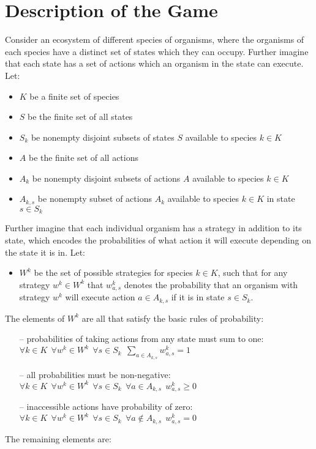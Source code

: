 \section{Description of the Game}\label{section:formalism}

Consider an ecosystem of different species of organisms, where the organisms of each species have a distinct set of states which they can occupy. Further imagine that each state has a set of actions which an organism in the state can execute.
Let:
\begin{itemize}[leftmargin=*,labelsep=4mm]
\item   $K$ be a finite set of species
\item	$S$ be the finite set of all states
\item   $S_k$ be nonempty disjoint subsets of states $S$ available to species $k\in K$
\item   $A$ be the finite set of all actions
\item   $A_k$ be nonempty disjoint subsets of actions $A$ available to species $k\in K$
\item   $A_{k,s}$ be nonempty subset of actions $A_k$ available to species $k\in K$ in state $s\in S_k$
\end{itemize}
Further imagine that each individual organism has a strategy in addition to its state, which encodes the probabilities of what action it will execute depending on the state it is in.
Let:

\begin{itemize}[leftmargin=*,labelsep=4mm]
\item   $W^k$ be the set of possible strategies for species $k\in K$, such that for any strategy $w^k \in W^k$ that $w^k_{a,s}$ denotes the probability that an organism with strategy $w^k$ will execute action $a\in A_{k,s}$ if it is in state $s\in S_k$.
\end{itemize}
The elements of $W^k$ are all that satisfy the basic rules of probability:
\begin{itemize}[leftmargin=*,labelsep=4mm]
\item[--]   probabilities of taking actions from any state must sum to one:\\\-\hspace{8mm} $\forall k\in K~~\forall w^k\in W^k~~\forall s\in S_k~~ \sum_{a\in A_{k,s}}w^k_{a,s}=1$
\item[--]   all probabilities must be non-negative:\\\-\hspace{8mm} $\forall k\in K~~\forall w^k\in W^k~~\forall s\in S_k~~\forall a\in A_{k,s}~~ w^k_{a,s}\ge 0$
\item[--]   inaccessible actions have probability of zero:\\\-\hspace{8mm} $\forall k\in K~~\forall w^k\in W^k~~\forall s\in S_k~~\forall a\notin A_{k,s}~~ w^k_{a,s}= 0$
\end{itemize}
The remaining elements are:

